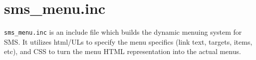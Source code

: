 \section{sms\_menu.inc}

\verb|sms_menu.inc| is an include file which builds the dynamic menuing system for SMS.
It utilizes html/ULs to specify the menu specifics (link text, targets, items,
etc), and CSS to turn the menu HTML representation into the actual menus.


